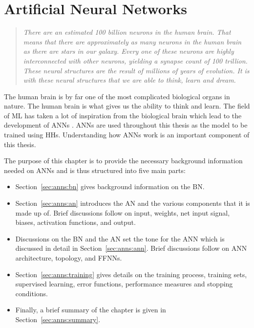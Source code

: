 \chapter{Artificial Neural Networks}
\label{chap:anns}

\begin{quote}
    \textit{There are an estimated 100 billion neurons in the human brain. That
        means that there are approximately as many neurons in the human brain as
        there are stars in our galaxy. Every one of these neurons are highly
        interconnected with other neurons, yielding a synapse count of 100
        trillion. These neural structures are the result of millions of years
        of evolution. It is with these neural structures that we are able to think,
    learn and dream.}
\end{quote}

The human brain is by far one of the most complicated biological organs in
nature. The human brain is what gives us the ability to think and learn. The
field of \ac{ML} has taken a lot of inspiration from the biological brain which
lead to the development of \acp{ANN} \cite{ref:rosenblatt:1958}. \acp{ANN}
are used throughout this thesis as the model to be trained using \acp{HH}.
Understanding how \acp{ANN} work is an important component of this thesis.

The purpose of this chapter is to provide the necessary background information
needed on \acp{ANN} and is thus structured into five main parts: 

\begin{itemize}
    \item
    Section~\ref{sec:anns:bn} gives background information on the \ac{BN}.

    \item
    Section~\ref{sec:anns:an} introduces the \ac{AN} and the various
    components that it is made up of. Brief discussions follow on
    input, weights, net input signal, biases,
    activation functions, and
    output.

    \item
    Discussions on the \ac{BN} and the \ac{AN} set the tone for the \ac{ANN}
    which is discussed in detail in Section~\ref{sec:anns:ann}. Brief
    discussions follow on \ac{ANN} architecture, topology, and
    \acp{FFNN}. 

    \item
    Section~\ref{sec:anns:training} gives details on the training process,
    training sets, supervised learning,
    error functions, performance measures
    and stopping conditions.

    \item
    Finally, a brief summary of the chapter is given in
    Section~\ref{sec:anns:summary}.
\end{itemize}


